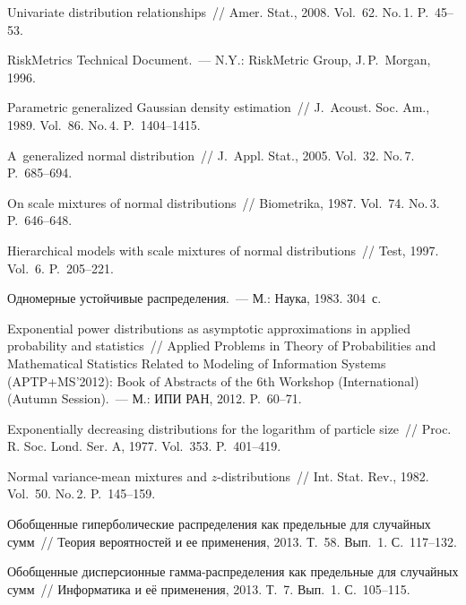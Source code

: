 \begin{multicols}{2}
{{\begin{thebibliography}{99}
 Univariate distribution
relationships~// Amer. Stat., 2008. Vol.~62. No.\,1. P.~45--53.

RiskMetrics Technical Document.~--- N.Y.: RiskMetric Group, J.\,P.~Morgan, 1996.

 Parametric generalized Gaussian
density estimation~// J.~Acoust. Soc. Am.,
1989. Vol.~86. No.\,4. P.~1404--1415.

 A~generalized normal distribution~// J.~Appl. 
Stat., 2005. Vol.~32. No.\,7. P.~685--694.

 On scale mixtures of normal
distributions~// Biometrika, 1987. Vol.~74. No.\,3. P.~646--648.

 Hierarchical models with scale
mixtures of normal distributions~// Test, 1997. Vol.~6. P.~205--221.

 Одномерные устойчивые распределения.~--- М.: Наука, 1983. 304~с.

Exponential power distributions as asymptotic approximations in
applied probability and statistics~// Applied Problems in Theory of
Probabilities and Mathematical Statistics Related to Modeling of
Information Systems (APTP\;+\;MS'2012): Book of Abstracts of the 6th
 Workshop (International) (Autumn Session).~--- М.: ИПИ РАН, 2012. P.~60--71.

 Exponentially decreasing distributions
for the logarithm of particle size~// Proc. R. Soc. Lond. Ser.
A, 1977. Vol.~353. P.~401--419.

 Normal
variance-mean mixtures and $z$-distributions~// Int.
Stat. Rev., 1982. Vol.~50. No.\,2. P.~145--159.

 Обобщенные гиперболические распределения как
предельные для случайных сумм~// Теория вероятностей и ее
применения, 2013. Т.~58. Вып.~1. С.~117--132.

 Обобщенные дисперсионные
гамма-распределения как предельные для случайных сумм~// Информатика
и её применения, 2013. Т.~7. Вып.~1. С.~105--115.


\end{thebibliography}}}
\end{multicols}
